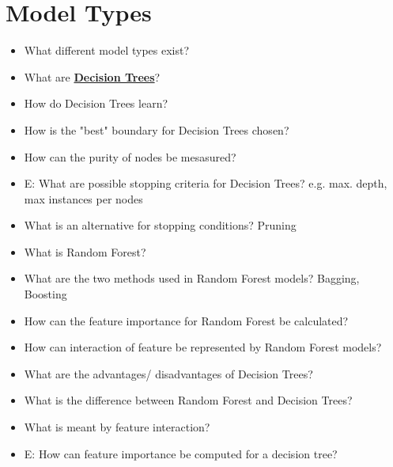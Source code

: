 \documentclass{report}
\begin{document}
\begin{itemize}
	\end{itemize}

	\section{Model Types}
	
	\begin{itemize}
		\item What different model types exist?
		\newline 
		
		\item What are \textbf{\underline{Decision Trees}}?
		\newline 
		\item How do Decision Trees learn?
		\newline 
		\item How is the "best" boundary for Decision Trees chosen?
		\newline 
		\item How can the purity of nodes be mesasured?
		\newline 
		\item E: What are possible stopping criteria for Decision Trees?
		\newline e.g. max. depth, max instances per nodes
		\item What is an alternative for stopping conditions?
		\newline Pruning
		\item What is Random Forest?
		\newline 
		\item What are the two methods used in Random Forest models?
		\newline Bagging, Boosting
		\item How can the feature importance for Random Forest be calculated?
		\newline 
		\item How can interaction of feature be represented by Random Forest models?
		\newline 
		\item What are the advantages/ disadvantages of Decision Trees?
		\newline 
		\item What is the difference between Random Forest and Decision Trees?
		\newline 
		\item What is meant by feature interaction?
		\newline 
		\item E: How can feature importance be computed for a decision tree?
		\newline 
		

\end{itemize}
\end{document}
